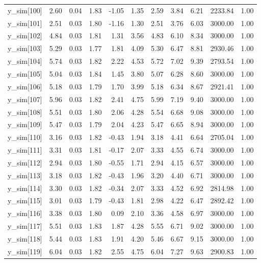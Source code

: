 \begin{table}[ht]
\begin{tabular}{rrrrrrrrrrr}
  y\_sim[100] & 2.60 & 0.04 & 1.83 & -1.05 & 1.35 & 2.59 & 3.84 & 6.21 & 2233.84 & 1.00 \\ 
  y\_sim[101] & 2.51 & 0.03 & 1.80 & -1.16 & 1.30 & 2.51 & 3.76 & 6.03 & 3000.00 & 1.00 \\ 
  y\_sim[102] & 4.84 & 0.03 & 1.81 & 1.31 & 3.56 & 4.83 & 6.10 & 8.34 & 3000.00 & 1.00 \\ 
  y\_sim[103] & 5.29 & 0.03 & 1.77 & 1.81 & 4.09 & 5.30 & 6.47 & 8.81 & 2930.46 & 1.00 \\ 
  y\_sim[104] & 5.74 & 0.03 & 1.82 & 2.22 & 4.53 & 5.72 & 7.02 & 9.39 & 2793.54 & 1.00 \\ 
  y\_sim[105] & 5.04 & 0.03 & 1.84 & 1.45 & 3.80 & 5.07 & 6.28 & 8.60 & 3000.00 & 1.00 \\ 
  y\_sim[106] & 5.18 & 0.03 & 1.79 & 1.70 & 3.99 & 5.18 & 6.34 & 8.67 & 2921.41 & 1.00 \\ 
  y\_sim[107] & 5.96 & 0.03 & 1.82 & 2.41 & 4.75 & 5.99 & 7.19 & 9.40 & 3000.00 & 1.00 \\ 
  y\_sim[108] & 5.51 & 0.03 & 1.80 & 2.06 & 4.28 & 5.54 & 6.68 & 9.08 & 3000.00 & 1.00 \\ 
  y\_sim[109] & 5.47 & 0.03 & 1.79 & 2.04 & 4.23 & 5.47 & 6.65 & 8.94 & 3000.00 & 1.00 \\ 
  y\_sim[110] & 3.16 & 0.03 & 1.82 & -0.43 & 1.94 & 3.18 & 4.41 & 6.64 & 2705.04 & 1.00 \\ 
  y\_sim[111] & 3.31 & 0.03 & 1.81 & -0.17 & 2.07 & 3.33 & 4.55 & 6.74 & 3000.00 & 1.00 \\ 
  y\_sim[112] & 2.94 & 0.03 & 1.80 & -0.55 & 1.71 & 2.94 & 4.15 & 6.57 & 3000.00 & 1.00 \\ 
  y\_sim[113] & 3.18 & 0.03 & 1.82 & -0.43 & 1.96 & 3.20 & 4.40 & 6.71 & 3000.00 & 1.00 \\ 
  y\_sim[114] & 3.30 & 0.03 & 1.82 & -0.34 & 2.07 & 3.33 & 4.52 & 6.92 & 2814.98 & 1.00 \\ 
  y\_sim[115] & 3.01 & 0.03 & 1.79 & -0.43 & 1.81 & 2.98 & 4.22 & 6.47 & 2892.42 & 1.00 \\ 
  y\_sim[116] & 3.38 & 0.03 & 1.80 & 0.09 & 2.10 & 3.36 & 4.58 & 6.97 & 3000.00 & 1.00 \\ 
  y\_sim[117] & 5.51 & 0.03 & 1.83 & 1.87 & 4.28 & 5.55 & 6.71 & 9.02 & 3000.00 & 1.00 \\ 
  y\_sim[118] & 5.44 & 0.03 & 1.83 & 1.91 & 4.20 & 5.46 & 6.67 & 9.15 & 3000.00 & 1.00 \\ 
  y\_sim[119] & 6.04 & 0.03 & 1.82 & 2.55 & 4.75 & 6.04 & 7.27 & 9.63 & 2900.83 & 1.00 \\ 

\end{tabular}
\end{table}
